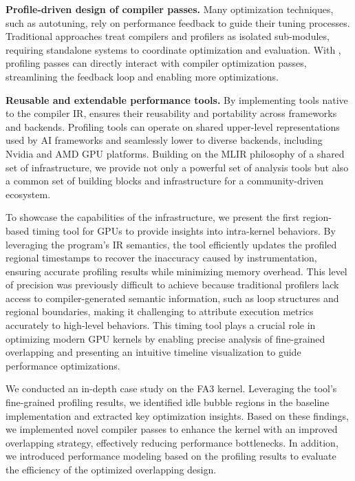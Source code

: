 \textbf{ Profile-driven design of compiler passes.} Many optimization techniques, such as autotuning\cite{tunner1, tunner-autotvm}, rely on performance feedback to guide their tuning processes\cite{zheng2020ansor}. Traditional approaches treat compilers and profilers as isolated sub-modules, requiring standalone systems to coordinate optimization and evaluation. With \thiswork{}, profiling passes can directly interact with compiler optimization passes, streamlining the feedback loop and enabling more optimizations.

\textbf{ Reusable and extendable performance tools.} By implementing tools native to the compiler IR, \thiswork{} ensures their reusability and portability across frameworks and backends. Profiling tools can operate on shared upper-level representations used by AI frameworks and seamlessly lower to diverse backends, including Nvidia and AMD GPU platforms. Building on the MLIR philosophy of a shared set of infrastructure, we provide not only a powerful set of analysis tools but also a common set of building blocks and infrastructure for a community-driven ecosystem.

To showcase the capabilities of the \thiswork{} infrastructure, we present the first region-based timing tool for GPUs to provide insights into intra-kernel behaviors. 
By leveraging the program's IR semantics, the tool efficiently updates the profiled regional timestamps to recover the inaccuracy caused by instrumentation, ensuring accurate profiling results while minimizing memory overhead. 
This level of precision was previously difficult to achieve because traditional profilers lack access to compiler-generated semantic information, such as loop structures and regional boundaries, making it challenging to attribute execution metrics accurately to high-level behaviors. 
This timing tool plays a crucial role in optimizing modern GPU kernels by enabling precise analysis of fine-grained overlapping and presenting an intuitive timeline visualization to guide performance optimizations.

We conducted an in-depth case study on the FA3 kernel. 
Leveraging the tool's fine-grained profiling results, we identified idle bubble regions in the baseline implementation and extracted key optimization insights. 
Based on these findings, we implemented novel compiler passes to enhance the kernel with an improved overlapping strategy, effectively reducing performance bottlenecks.
In addition, we introduced performance modeling based on the profiling results to evaluate the efficiency of the optimized overlapping design.


